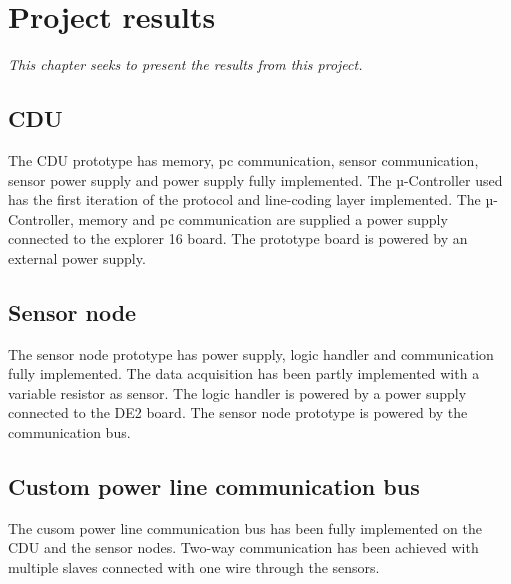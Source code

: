 \chapter{Project results}
\textit{This chapter seeks to present the results from this project.}
\section{CDU}
The CDU prototype has memory, pc communication, sensor communication, sensor power supply and power supply fully implemented. The µ-Controller used has the first iteration of the protocol and line-coding layer implemented. The µ-Controller, memory and pc communication are supplied a power supply connected to the explorer 16 board. The prototype board is powered by an external power supply.

\section{Sensor node}
The sensor node prototype has power supply, logic handler and communication fully implemented. The data acquisition has been partly implemented with a variable resistor as sensor. The logic handler is powered by a power supply connected to the DE2 board. The sensor node prototype is powered by the communication bus.

\section{Custom power line communication bus}
The cusom power line communication bus has been fully implemented on the CDU and the sensor nodes. Two-way communication has been achieved with multiple slaves connected with one wire through the sensors.







